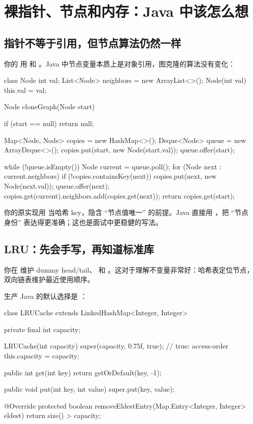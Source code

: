 \chapter{裸指针、节点和内存：Java 中该怎么想}

\section{指针不等于引用，但节点算法仍然一样}

你的  用  和 。Java 中节点变量本质上是对象引用，图克隆的算法没有变化：

\begin{javacode}
class Node {
    int val;
    List<Node> neighbors = new ArrayList<>();
    Node(int val) { this.val = val; }
}

Node cloneGraph(Node start) {
    if (start == null) return null;

    Map<Node, Node> copies = new HashMap<>();
    Deque<Node> queue = new ArrayDeque<>();
    copies.put(start, new Node(start.val));
    queue.offer(start);

    while (!queue.isEmpty()) {
        Node current = queue.poll();
        for (Node next : current.neighbors) {
            if (!copies.containsKey(next)) {
                copies.put(next, new Node(next.val));
                queue.offer(next);
            }
            copies.get(current).neighbors.add(copies.get(next));
        }
    }
    return copies.get(start);
}
\end{javacode}

\begin{transfer}
你的原实现用  当哈希 key，隐含 ``节点值唯一'' 的前提。Java 直接用 ，把 ``节点身份'' 表达得更准确；这也是面试中更稳健的写法。
\end{transfer}

\section{LRU：先会手写，再知道标准库}

你在  维护 dummy head/tail、 和 。这对于理解不变量非常好：哈希表定位节点，双向链表维护最近使用顺序。

生产 Java 的默认选择是 ：

\begin{javacode}
class LRUCache extends LinkedHashMap<Integer, Integer> {
    private final int capacity;

    LRUCache(int capacity) {
        super(capacity, 0.75f, true); // true: access-order
        this.capacity = capacity;
    }

    public int get(int key) {
        return getOrDefault(key, -1);
    }

    public void put(int key, int value) {
        super.put(key, value);
    }

    @Override
    protected boolean removeEldestEntry(Map.Entry<Integer, Integer> eldest) {
        return size() > capacity;
    }
}
\end{javacode}

